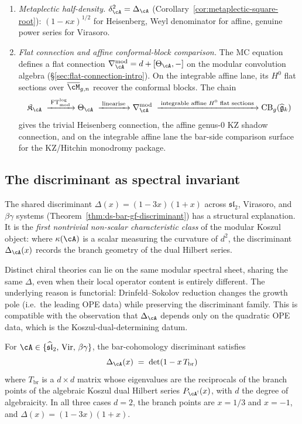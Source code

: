 \begin{enumerate}[label=\textup{(\alph*)}]
\item \emph{Metaplectic half-density.}
 $\delta_\cA^2 = \Delta_\cA$
 (Corollary~\ref{cor:metaplectic-square-root}):
 $(1 - \kappa x)^{1/2}$ for Heisenberg,
 Weyl denominator for affine, genuine power series for Virasoro.

\item \emph{Flat connection and affine conformal-block comparison.}
 The MC equation defines a flat connection
 $\nabla^{\mathrm{mod}}_\cA = d + [\Theta_\cA, -]$ on the
 modular convolution algebra
 (\S\ref{sec:flat-connection-intro}). On the integrable affine
 lane, its $H^0$ flat sections over $\overline{\cM}_{g,n}$
 recover the conformal blocks. The chain
 \[
 \mathfrak K_\cA
 \;\xrightarrow{\;\operatorname{FT}^{\log}_{\mathrm{mod}}\;}
 \Theta_\cA
 \;\xrightarrow{\;\text{linearise}\;}
 \nabla^{\mathrm{mod}}_\cA
 \;\xrightarrow{\;\text{integrable affine }H^0\text{ flat sections}\;}
 \operatorname{CB}_g(\widehat{\mathfrak g}_k)
 \]
 gives the trivial Heisenberg connection, the affine genus-$0$
 KZ shadow connection, and on the integrable affine lane the
 bar-side comparison surface for the KZ/Hitchin monodromy
 package.
\end{enumerate}

\subsection{The discriminant as spectral invariant}

The shared discriminant $\Delta(x) = (1 - 3x)(1+x)$ across
$\mathfrak{sl}_2$, Virasoro, and $\beta\gamma$ systems
(Theorem~\ref{thm:ds-bar-gf-discriminant}) has a structural
explanation. It is the \emph{first nontrivial non-scalar
characteristic class} of the modular Koszul object: where
$\kappa(\cA)$ is a scalar measuring the curvature of $d^2$,
the discriminant $\Delta_{\cA}(x)$ records the branch geometry
of the dual Hilbert series.

Distinct chiral theories can lie on the same modular spectral
sheet, sharing the same $\Delta$, even when their local
operator content is entirely different. The underlying reason
is functorial: Drinfeld--Sokolov reduction changes the growth pole
(i.e.\ the leading OPE data) while preserving the discriminant
family. This is compatible with the observation that
$\Delta_{\cA}$ depends only on the quadratic OPE data, which is
the Koszul-dual-determining datum.

\begin{theorem}
\label{thm:discriminant-spectral-verified}
For $\cA \in \{\widehat{\mathfrak{sl}}_2,\, \mathrm{Vir},\,
\beta\gamma\}$, the bar-cohomology discriminant satisfies
\[
\Delta_{\cA}(x) \;=\; \det(1 - x\, T_{\mathrm{br}})
\]
where $T_{\mathrm{br}}$ is a $d \times d$ matrix whose eigenvalues
are the reciprocals of the branch points of the algebraic Koszul
dual Hilbert series $P_{\cA^!}(x)$, with $d$ the degree of
algebraicity.
In all three cases $d = 2$, the branch points are $x = 1/3$
and $x = -1$, and
$\Delta(x) = (1 - 3x)(1 + x)$.
\end{theorem}

